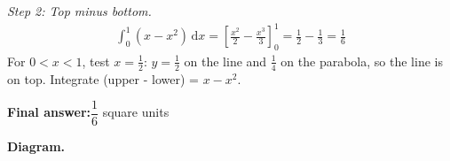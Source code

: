 \documentclass[11pt]{article}
\begin{document}
\textit{Step 2: Top minus bottom.}
\[\begin{gathered}
\int_0^1(x-x^2)\,\mathrm{d}x = \left[\frac{x^2}{2}-\frac{x^3}{3}\right]_0^1 = \frac{1}{2}-\frac{1}{3}=\frac{1}{6}
\end{gathered}\]
For \( 0 < x < 1 \), test \( x = \tfrac{1}{2} \): \( y = \tfrac{1}{2} \) on the line and \( \tfrac{1}{4} \) on the parabola, so the line is on top. Integrate (upper - lower) = \( x - x^2 \).

\begin{answerbox}
\textbf{Final answer:}\quad \(\displaystyle  \dfrac{1}{6} \) square units
\end{answerbox}
\textbf{Diagram.}

\begin{center}
\end{center}
\end{document}
